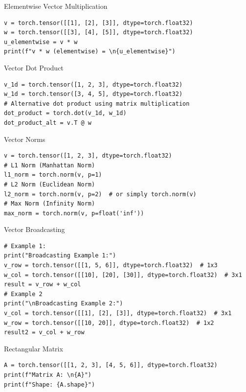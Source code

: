 \documentclass[aspectratio=169,xcolor=dvipsnames,svgnames,x11names,fleqn]{beamer}
\begin{document}
\begin{frame}[containsverbatim]{Elementwise Vector Multiplication}
\begin{verbatim}
v = torch.tensor([[1], [2], [3]], dtype=torch.float32)
w = torch.tensor([[3], [4], [5]], dtype=torch.float32)
u_elementwise = v * w
print(f"v * w (elementwise) = \n{u_elementwise}")
\end{verbatim}
\end{frame}


\begin{frame}[containsverbatim]{Vector Dot Product}
\begin{verbatim}
v_1d = torch.tensor([1, 2, 3], dtype=torch.float32)
w_1d = torch.tensor([3, 4, 5], dtype=torch.float32)
# Alternative dot product using matrix multiplication
dot_product = torch.dot(v_1d, w_1d)
dot_product_alt = v.T @ w
\end{verbatim}
\end{frame}

\begin{frame}[containsverbatim]{Vector Norms}
\begin{verbatim}
v = torch.tensor([1, 2, 3], dtype=torch.float32)
# L1 Norm (Manhattan Norm)
l1_norm = torch.norm(v, p=1)
# L2 Norm (Euclidean Norm)
l2_norm = torch.norm(v, p=2)  # or simply torch.norm(v)
# Max Norm (Infinity Norm)
max_norm = torch.norm(v, p=float('inf'))
\end{verbatim}
\end{frame}

\begin{frame}[containsverbatim]{Vector Broadcasting}
\begin{verbatim}
# Example 1:
print("Broadcasting Example 1:")
v_row = torch.tensor([[1, 5, 6]], dtype=torch.float32)  # 1x3
w_col = torch.tensor([[10], [20], [30]], dtype=torch.float32)  # 3x1
result = v_row + w_col
# Example 2
print("\nBroadcasting Example 2:")
v_col = torch.tensor([[1], [2], [3]], dtype=torch.float32)  # 3x1
w_row = torch.tensor([[10, 20]], dtype=torch.float32)  # 1x2
result2 = v_col + w_row
\end{verbatim}
\end{frame}

\begin{frame}[containsverbatim]{Rectangular Matrix}
\begin{verbatim}
A = torch.tensor([[1, 2, 3], [4, 5, 6]], dtype=torch.float32)
print(f"Matrix A: \n{A}")
print(f"Shape: {A.shape}")
\end{verbatim}
\end{frame}
\end{document}
